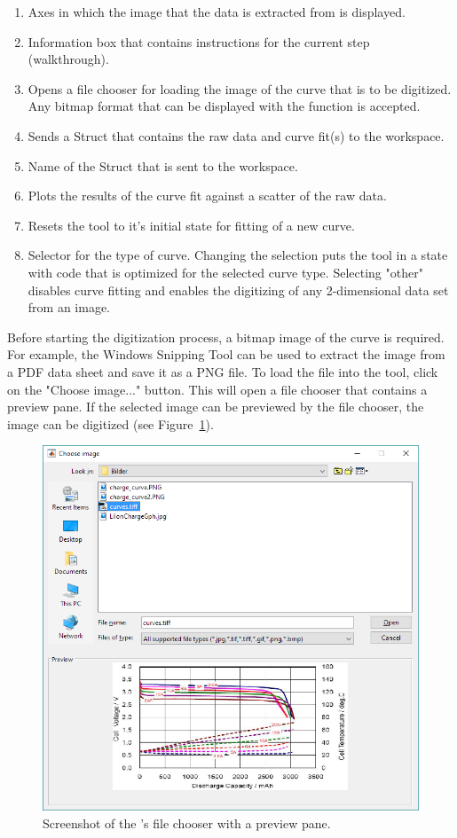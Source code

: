 \begin{enumerate}
	\item Axes in which the image that the data is extracted from is displayed.
	\item Information box that contains instructions for the current step (walkthrough).
	\item Opens a file chooser for loading the image of the curve that is to be digitized. Any bitmap format that can be displayed with the  function is accepted.
	\item Sends a Struct that contains the raw data and curve fit(s) to the workspace.
	\item Name of the Struct that is sent to the workspace.
	\item Plots the results of the curve fit against a scatter of the raw data.
	\item Resets the tool to it's initial state for fitting of a new curve.
	\item Selector for the type of curve. Changing the selection puts the tool in a state with code that is optimized for the selected curve type. Selecting "other" disables curve fitting and enables the digitizing of any 2-dimensional data set from an image.
\end{enumerate}
Before starting the digitization process, a bitmap image of the curve is required. For example, the Windows Snipping Tool can be used to extract the image from a PDF data sheet and save it as a PNG file. To load the file into the tool, click on the "Choose image..." button. This will open a file chooser that contains a preview pane. If the selected image can be previewed by the file chooser, the image can be digitized (see Figure~\ref{fig:file_chooser}).
\begin{figure}[b!]
	\captionsetup{type=figure}
	\centering
	\includegraphics[width=.57\textwidth]{file_chooser.png}
	\caption[Screenshot of the 's file chooser with a preview pane]{Screenshot of the 's file chooser with a preview pane.}
	\label{fig:file_chooser}
\end{figure}
